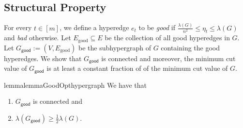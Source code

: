 \documentclass[11pt]{article}
\theoremstyle{definition}
\newcommand{\good}{\mathsf{good}}
\begin{document}
\subsection{Structural Property}\label{section:hypergraph-structural-property}
For every $t\in [m]$, we define a hyperedge $e_t$ to be \emph{good} if $\frac{\lambda(G)}{n^2}\leq \eta_t\leq \lambda(G)$ and \emph{bad} otherwise. Let $E_{\text{good}}\subseteq E$ be the collection of all good hyperedges in $G$. Let $G_{\good}:=(V,E_{\text{good}})$ be the subhypergraph of $G$ containing the good hyperedges. 
We show that $G_{\good}$ is connected and moreover, the minimum cut value of $G_{\good}$ is at least a constant fraction of of the minimum cut value of $G$.

\begin{restatable}{lemma}{lemmaGoodOpthypergraph}\label{lemma:new-opt-hypergraph}
We have that 
\begin{enumerate}
    \item $G_{\good}$ is connected and 
    \item $\lambda(G_{\good})\geq \frac{1}{2}\lambda(G)$. 
\end{enumerate}
\end{restatable}
\end{document}
